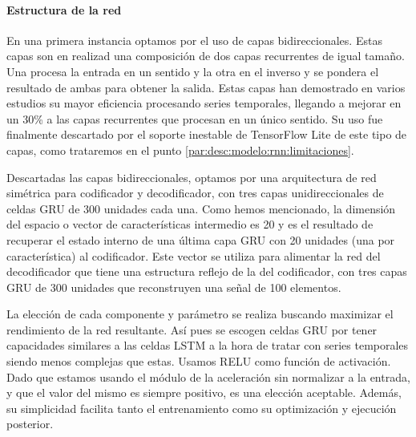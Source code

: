 \paragraph{Estructura de la red}
En una primera instancia optamos por el uso de capas bidireccionales\cite{Schuster1997}. Estas capas son en realizad una composición de dos capas recurrentes de igual tamaño. Una procesa la entrada en un sentido y la otra en el inverso y se pondera el resultado de ambas para obtener la salida. Estas capas han demostrado en varios estudios \cite{Zaho2017, Su2018} su mayor eficiencia procesando series temporales, llegando a mejorar en un 30\% a las capas recurrentes que procesan en un único sentido. Su uso fue finalmente descartado por el soporte inestable de TensorFlow Lite de este tipo de capas, como trataremos en el punto \ref{par:desc:modelo:rnn:limitaciones}.

Descartadas las capas bidireccionales, optamos por una arquitectura de red simétrica para codificador y decodificador, con tres capas unidireccionales de celdas GRU de 300 unidades cada una. Como hemos mencionado, la dimensión del espacio o vector de características intermedio es 20 y es el resultado de recuperar el estado interno de una última capa GRU con 20 unidades (una por característica) al codificador. Este vector se utiliza para alimentar la red del decodificador que tiene una estructura reflejo de la del codificador, con tres capas GRU de 300 unidades que reconstruyen una señal de 100 elementos.

La elección de cada componente y parámetro se realiza buscando maximizar el rendimiento de la red resultante. Así pues se escogen celdas GRU por tener capacidades similares a las celdas LSTM a la hora de tratar con series temporales \cite{Chung2014} siendo menos complejas que estas. Usamos RELU como función de activación. Dado que estamos usando el módulo de la aceleración sin normalizar a la entrada, y que el valor del mismo es siempre positivo, es una elección aceptable. Además, su simplicidad facilita tanto el entrenamiento como su optimización y ejecución posterior.  


